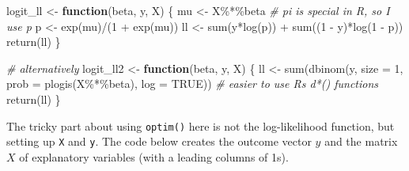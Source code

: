 \documentclass[
]{book}
\newenvironment{Shaded}{\begin{snugshade}}{\end{snugshade}}
\newcommand{\AttributeTok}[1]{\textcolor[rgb]{0.77,0.63,0.00}{#1}}
\newcommand{\CommentTok}[1]{\textcolor[rgb]{0.56,0.35,0.01}{\textit{#1}}}
\newcommand{\ConstantTok}[1]{\textcolor[rgb]{0.00,0.00,0.00}{#1}}
\newcommand{\ControlFlowTok}[1]{\textcolor[rgb]{0.13,0.29,0.53}{\textbf{#1}}}
\newcommand{\DecValTok}[1]{\textcolor[rgb]{0.00,0.00,0.81}{#1}}
\newcommand{\FunctionTok}[1]{\textcolor[rgb]{0.00,0.00,0.00}{#1}}
\newcommand{\NormalTok}[1]{#1}
\newcommand{\OtherTok}[1]{\textcolor[rgb]{0.56,0.35,0.01}{#1}}
\newcommand{\SpecialCharTok}[1]{\textcolor[rgb]{0.00,0.00,0.00}{#1}}
\begin{document}
\begin{Shaded}
\begin{Highlighting}[]
\NormalTok{logit\_ll }\OtherTok{\textless{}{-}} \ControlFlowTok{function}\NormalTok{(beta, y, X) \{}
\NormalTok{  mu }\OtherTok{\textless{}{-}}\NormalTok{ X}\SpecialCharTok{\%*\%}\NormalTok{beta  }\CommentTok{\# pi is special in R, so I use p}
\NormalTok{  p }\OtherTok{\textless{}{-}} \FunctionTok{exp}\NormalTok{(mu)}\SpecialCharTok{/}\NormalTok{(}\DecValTok{1} \SpecialCharTok{+} \FunctionTok{exp}\NormalTok{(mu))}
\NormalTok{  ll }\OtherTok{\textless{}{-}} \FunctionTok{sum}\NormalTok{(y}\SpecialCharTok{*}\FunctionTok{log}\NormalTok{(p)) }\SpecialCharTok{+} \FunctionTok{sum}\NormalTok{((}\DecValTok{1} \SpecialCharTok{{-}}\NormalTok{ y)}\SpecialCharTok{*}\FunctionTok{log}\NormalTok{(}\DecValTok{1} \SpecialCharTok{{-}}\NormalTok{ p))}
  \FunctionTok{return}\NormalTok{(ll)}
\NormalTok{\}}

\CommentTok{\# alternatively}
\NormalTok{logit\_ll2 }\OtherTok{\textless{}{-}} \ControlFlowTok{function}\NormalTok{(beta, y, X) \{}
\NormalTok{  ll }\OtherTok{\textless{}{-}} \FunctionTok{sum}\NormalTok{(}\FunctionTok{dbinom}\NormalTok{(y, }\AttributeTok{size =} \DecValTok{1}\NormalTok{, }\AttributeTok{prob =} \FunctionTok{plogis}\NormalTok{(X}\SpecialCharTok{\%*\%}\NormalTok{beta), }\AttributeTok{log =} \ConstantTok{TRUE}\NormalTok{))  }\CommentTok{\# easier to use R\textquotesingle{}s d*() functions}
  \FunctionTok{return}\NormalTok{(ll)}
\NormalTok{\}}
\end{Highlighting}
\end{Shaded}

The tricky part about using \texttt{optim()} here is not the log-likelihood function, but setting up \texttt{X} and \texttt{y}. The code below creates the outcome vector \(y\) and the matrix \(X\) of explanatory variables (with a leading columns of 1s).
\end{document}
